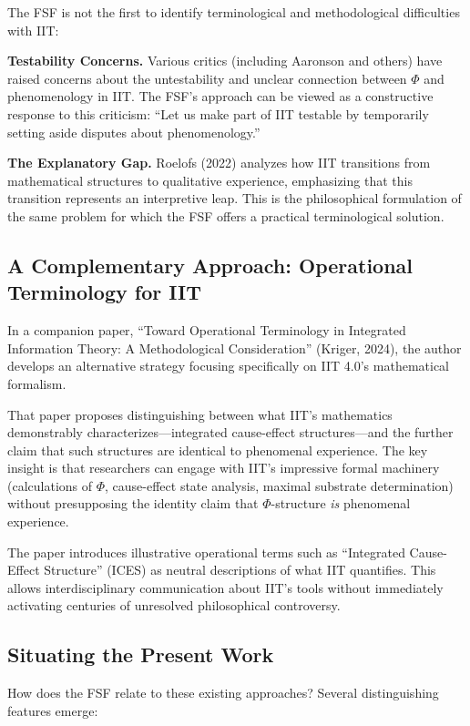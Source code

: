 \documentclass[12pt,a4paper]{article}
\begin{document}
The FSF is not the first to identify terminological and methodological difficulties with IIT:

\textbf{Testability Concerns.} Various critics (including Aaronson and others) have raised concerns about the untestability and unclear connection between $\Phi$ and phenomenology in IIT. The FSF's approach can be viewed as a constructive response to this criticism: ``Let us make part of IIT testable by temporarily setting aside disputes about phenomenology.''

\textbf{The Explanatory Gap.} Roelofs (2022) analyzes how IIT transitions from mathematical structures to qualitative experience, emphasizing that this transition represents an interpretive leap. This is the philosophical formulation of the same problem for which the FSF offers a practical terminological solution.

\subsection{A Complementary Approach: Operational Terminology for IIT}

In a companion paper, ``Toward Operational Terminology in Integrated Information Theory: A Methodological Consideration'' (Kriger, 2024), the author develops an alternative strategy focusing specifically on IIT 4.0's mathematical formalism.

That paper proposes distinguishing between what IIT's mathematics demonstrably characterizes---integrated cause-effect structures---and the further claim that such structures are identical to phenomenal experience. The key insight is that researchers can engage with IIT's impressive formal machinery (calculations of $\Phi$, cause-effect state analysis, maximal substrate determination) without presupposing the identity claim that $\Phi$-structure \textit{is} phenomenal experience.

The paper introduces illustrative operational terms such as ``Integrated Cause-Effect Structure'' (ICES) as neutral descriptions of what IIT quantifies. This allows interdisciplinary communication about IIT's tools without immediately activating centuries of unresolved philosophical controversy.

\subsection{Situating the Present Work}

How does the FSF relate to these existing approaches? Several distinguishing features emerge:
\end{document}
